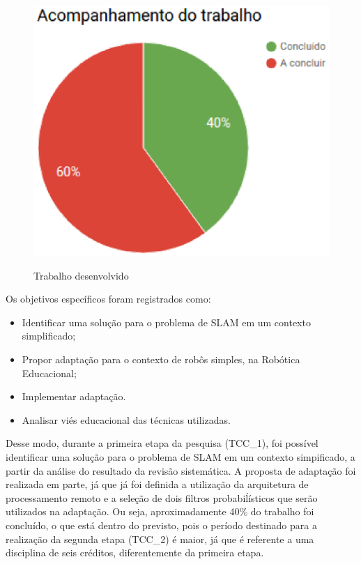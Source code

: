 \begin{figure}[H]
	\centering
	\includegraphics[scale=0.6]{figuras/porcentagem.eps}
	\label{img:porcentagemFinal}
	\caption[Trabalho Desenvolvido]{Trabalho desenvolvido}
\end{figure}

Os objetivos específicos foram registrados como:

\begin{itemize}
	\item Identificar uma solução para o problema de SLAM em um contexto simplificado;
	\item Propor adaptação para o contexto de robôs simples, na Robótica Educacional;
	\item Implementar adaptação.
	\item Analisar viés educacional das técnicas utilizadas.
\end{itemize}

Desse modo, durante a primeira etapa da pesquisa (TCC\_1), foi possível identificar uma solução para o problema de SLAM em um contexto simpificado, a partir da análise do resultado da revisão sistemática. A proposta de adaptação foi realizada em parte, já que já foi definida a utilização da arquitetura de processamento remoto e a seleção de dois filtros probabiĺísticos que serão utilizados na adaptação. Ou seja, aproximadamente 40\% do trabalho foi concluído, o que está dentro do previsto, pois o período destinado para a realização da segunda etapa (TCC\_2) é maior, já que é referente a uma disciplina de seis créditos, diferentemente da primeira etapa.

